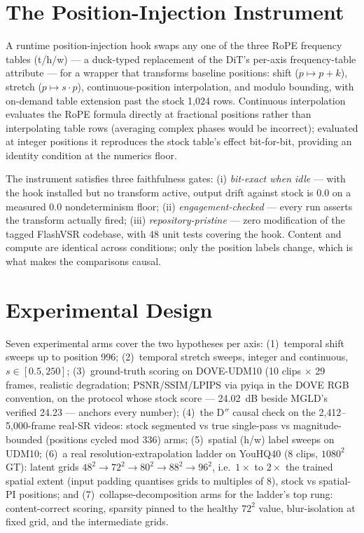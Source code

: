 \section{The Position-Injection Instrument}
\label{sec:rope:instrument}

A runtime position-injection hook swaps any one of the three RoPE frequency tables
(t/h/w) --- a duck-typed replacement of the DiT's per-axis frequency-table
attribute --- for a wrapper that transforms baseline positions: shift
($p \mapsto p + k$), stretch ($p \mapsto s \cdot p$), continuous-position
interpolation, and modulo bounding, with on-demand table extension past the stock
1{,}024 rows. Continuous interpolation evaluates the RoPE formula directly at
fractional positions rather than interpolating table rows (averaging complex
phases would be incorrect); evaluated at integer positions it reproduces the stock
table's effect bit-for-bit, providing an identity condition at the numerics floor.

The instrument satisfies three faithfulness gates: (i) \emph{bit-exact when idle}
--- with the hook installed but no transform active, output drift against stock is
$0.0$ on a measured $0.0$ nondeterminism floor; (ii) \emph{engagement-checked} ---
every run asserts the transform actually fired; (iii) \emph{repository-pristine}
--- zero modification of the tagged FlashVSR codebase, with 48 unit tests covering
the hook. Content and compute are identical across conditions; only the position
labels change, which is what makes the comparisons causal.

\section{Experimental Design}
\label{sec:rope:design}

Seven experimental arms cover the two hypotheses per axis:
(1)~temporal shift sweeps up to position 996; (2)~temporal stretch sweeps,
integer and continuous, $s \in [0.5, 250]$; (3)~ground-truth scoring on
DOVE-UDM10 (10 clips $\times$ 29 frames, realistic degradation; PSNR/SSIM/LPIPS
via pyiqa in the DOVE RGB convention, on the protocol whose stock score ---
24.02~dB beside MGLD's verified 24.23 --- anchors every number); (4)~the D$''$
causal check on the 2{,}412--5{,}000-frame real-SR videos: stock segmented vs
true single-pass vs magnitude-bounded (positions cycled mod 336) arms;
(5)~spatial (h/w) label sweeps on UDM10; (6)~a real resolution-extrapolation
ladder on YouHQ40 (8 clips, $1080^2$ GT): latent grids
$48^2 \to 72^2 \to 80^2 \to 88^2 \to 96^2$, i.e.\ $1\times$ to $2\times$ the
trained spatial extent (input padding quantises grids to multiples of 8), stock
vs spatial-PI positions; and (7)~collapse-decomposition arms for the ladder's top
rung: content-correct scoring, sparsity pinned to the healthy $72^2$ value,
blur-isolation at fixed grid, and the intermediate grids.

